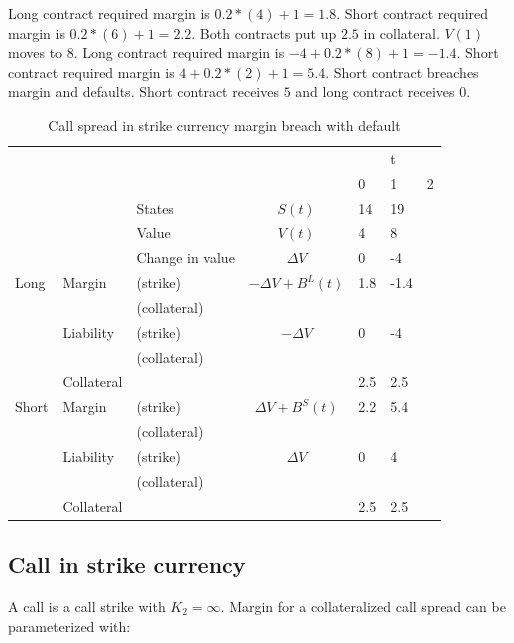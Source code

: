 \documentclass[12pt]{article}
\begin{document}
Long contract required margin is $0.2 *( 4) + 1 = 1.8$. Short contract required margin is $0.2 *( 6 )+ 1 = 2.2$. Both contracts put up $2.5$ in collateral.
$V(1)$ moves to 8. Long contract required margin is $-4+0.2*(8) +1 = -1.4$.  Short contract required margin is $ 4 + 0.2*(2)+ 1 = 5.4$. Short contract breaches margin and defaults. Short contract receives $5$ and long contract receives $0$.

\begin{table}
\begin{tabular}{lll|c|lll}
&  &  &  &  & t &\\  
&  &  &  & 0 & 1 & 2\\
\hline
\hline
&  & States &  $S(t)$ & 14 & 19 & \\
&  & Value  &  $V(t)$  & 4 & 8 &  \\
&  & Change in value & $\Delta V$ & 0& -4 &  \\
\hline
Long      & Margin    & (strike)     & $-\Delta V + B^L(t)$ & 1.8 & -1.4 &  \\
          &           & (collateral) & & & &\\ 
          & Liability & (strike)     & $-\Delta V$ & 0 & -4 & \\ 
          &           & (collateral)& & & &\\
          & Collateral&                       &    & 2.5 & 2.5 & \\          
\hline          
Short     & Margin    & (strike)     & $\Delta V + B^S(t)$  & 2.2 & 5.4 & \\
          &           & (collateral) & & & &\\
          & Liability & (strike)     & $\Delta V$ & 0 & 4 & \\
          &           & (collateral) & & & &\\
          & Collateral&                       &    & 2.5 & 2.5 & \\ 
          

\end{tabular}
\caption{Call spread in strike currency margin breach with default}
\label{fut}
\end{table}


\subsection{Call in strike currency}

A call is a call strike with $K_2=\infty$. Margin for a collateralized call spread can be parameterized with: 
\end{document}
